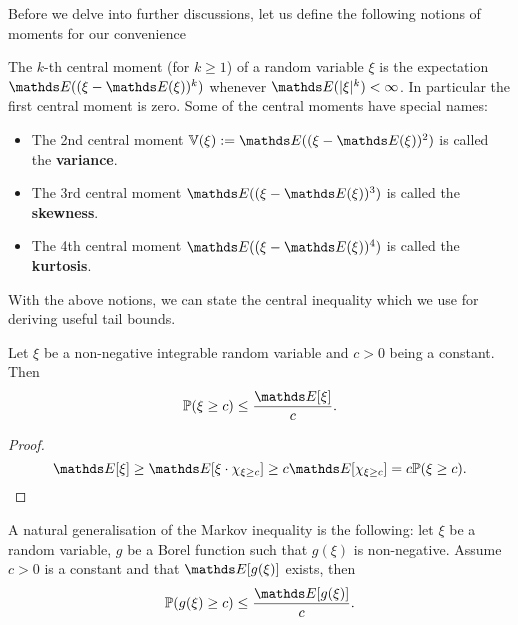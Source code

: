 Before we delve into further discussions, let us define the following notions of moments for our convenience

\begin{definition}
The $k$-th central moment (for $k \geq 1$) of a random variable $\xi$ is the expectation $\E((\xi - \E(\xi))^k)$ whenever $\E(|\xi|^k) < \infty$. In particular the first central moment is zero.
Some of the central moments have special names:
\begin{itemize}
    \item The 2nd central moment $\V(\xi) := \E((\xi-\E(\xi))^2)$ is called the \textbf{variance}.
    \item The 3rd central moment $\E((\xi-\E(\xi))^3)$ is called the \textbf{skewness}.
    \item The 4th central moment $\E((\xi-\E(\xi))^4)$ is called the \textbf{kurtosis}.
\end{itemize}
\end{definition}


With the above notions, we can state the central inequality which we use for deriving useful tail bounds.

\begin{theorem}
Let $\xi$ be a non-negative integrable random variable and $c>0$ being a constant. Then
\begin{equation}
    \p(\xi \ge c) \le \frac{\E[\xi]}{c}.
\end{equation}
\end{theorem}

\begin{proof}
\begin{equation*}
    \E[\xi] \ge \E[\xi \cdot \chi_{\xi \ge c}] \ge c \E[\chi_{\xi \ge c}] = c \p(\xi \ge c).
\end{equation*}
\end{proof}

\begin{remark} A natural generalisation of the Markov inequality is the following: let $\xi$ be a random variable, $g$ be a Borel function such that $g(\xi)$ is non-negative. Assume $c>0$ is a constant and that $\E[g(\xi)]$ exists, then
\begin{equation} \label{eq:Markov}
    \p(g(\xi) \ge c) \le \frac{\E[g(\xi)]}{c}.
\end{equation}
\end{remark}

